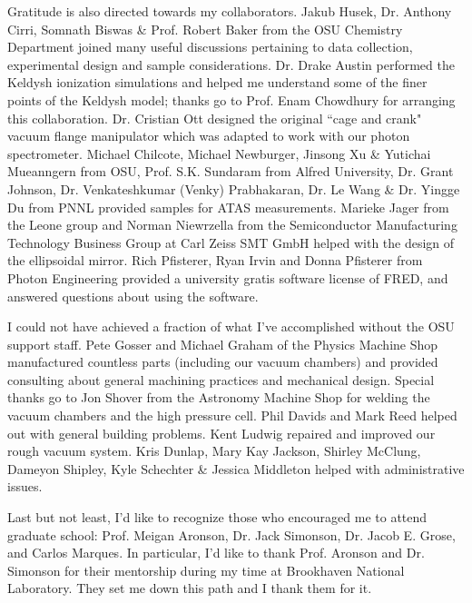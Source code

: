 \begin{acknowledgments}
Gratitude is also directed towards my collaborators. Jakub Husek, Dr. Anthony Cirri, Somnath Biswas \& Prof. Robert Baker from the OSU Chemistry Department joined many useful discussions pertaining to data collection, experimental design and sample considerations. Dr. Drake Austin performed the Keldysh ionization simulations and helped me understand some of the finer points of the Keldysh model; thanks go to Prof. Enam Chowdhury for arranging this collaboration. Dr. Cristian Ott designed the original ``cage and crank" vacuum flange manipulator which was adapted to work with our photon spectrometer. Michael Chilcote, Michael Newburger, Jinsong Xu \& Yutichai Mueanngern from OSU, Prof. S.K. Sundaram from Alfred University, Dr. Grant Johnson, Dr. Venkateshkumar (Venky) Prabhakaran, Dr. Le Wang \& Dr. Yingge Du from PNNL provided samples for ATAS measurements. Marieke Jager from the Leone group and Norman Niewrzella from the Semiconductor Manufacturing Technology Business Group at Carl Zeiss SMT GmbH helped with the design of the ellipsoidal mirror. Rich Pfisterer, Ryan Irvin and Donna Pfisterer from Photon Engineering provided a university gratis software license of FRED, and answered questions about using the software.

I could not have achieved a fraction of what I've accomplished without the OSU support staff. Pete Gosser and Michael Graham of the Physics Machine Shop manufactured countless parts (including our vacuum chambers) and provided consulting about general machining practices and mechanical design. Special thanks go to Jon Shover from the Astronomy Machine Shop for welding the vacuum chambers and the high pressure cell. Phil Davids and Mark Reed helped out with general building problems. Kent Ludwig repaired and improved our rough vacuum system. Kris Dunlap, Mary Kay Jackson, Shirley McClung, Dameyon Shipley, Kyle Schechter \& Jessica Middleton helped with administrative issues.

Last but not least, I'd like to recognize those who encouraged me to attend graduate school: Prof. Meigan Aronson, Dr. Jack Simonson, Dr. Jacob E. Grose, and Carlos Marques. In particular, I'd like to thank Prof. Aronson and Dr. Simonson for their mentorship during my time at Brookhaven National Laboratory. They set me down this path and I thank them for it.

\end{acknowledgments}
